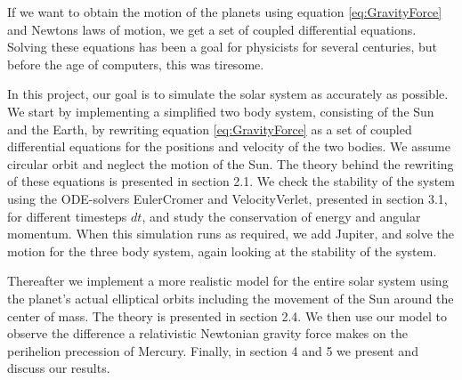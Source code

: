 \documentclass[norsk,a4paper,12pt]{article}
\begin{document}
If we want to obtain the motion of the planets using equation \ref{eq:GravityForce} and Newtons laws of motion,  we get a set of coupled differential equations. Solving these equations has been a goal for physicists for several centuries, but before the age of computers, this was tiresome.
\par 
\vspace{2mm}
In this project, our goal is to simulate the solar system as accurately as possible. We start by implementing a simplified two body system, consisting of the Sun and the Earth, by rewriting equation \ref{eq:GravityForce} as a set of coupled differential equations for the positions and velocity of the two bodies. We assume circular orbit and neglect the motion of the Sun. The theory behind the rewriting of these equations is presented in section 2.1.  We check the stability of the system using the ODE-solvers EulerCromer and VelocityVerlet, presented in section 3.1,  for different timesteps $dt$, and study the conservation of energy and angular momentum. When this simulation runs as required, we add Jupiter, and solve the motion for the three body system, again looking at the stability of the system. 
\par
\vspace{2mm}
Thereafter we implement a more realistic model for the entire solar system using the planet's actual elliptical orbits including the movement of the Sun around the center of mass. The theory is presented in section 2.4. We then use our model to observe the difference a relativistic Newtonian gravity force makes on the perihelion precession of Mercury. Finally, in section 4 and 5 we present and discuss our results.
\end{document}
